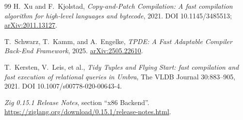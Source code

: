 \documentclass[11pt,a4paper]{article}
\begin{document}
\begin{thebibliography}{99}
H.~Xu and F.~Kjolstad,
\emph{Copy-and-Patch Compilation: A fast compilation algorithm for high-level languages and bytecode},
2021.
DOI 10.1145/3485513;
\href{https://arxiv.org/abs/2011.13127}{arXiv:2011.13127}.

T.~Schwarz, T.~Kamm, and A.~Engelke,
\emph{TPDE: A Fast Adaptable Compiler Back-End Framework},
2025.
\href{https://arxiv.org/abs/2505.22610}{arXiv:2505.22610}.

T.~Kersten, V.~Leis, et al.,
\emph{Tidy Tuples and Flying Start: fast compilation and fast execution of relational queries in Umbra},
The VLDB Journal 30:883--905, 2021.
DOI 10.1007/s00778-020-00643-4.

\emph{Zig 0.15.1 Release Notes}, section ``x86 Backend''.
\url{https://ziglang.org/download/0.15.1/release-notes.html}.

\end{thebibliography}
\end{document}
